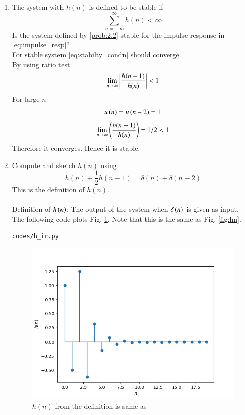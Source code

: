 \documentclass[journal,12pt,twocolumn]{IEEEtran}
\theoremstyle{remark}
\begin{document}
\begin{enumerate}[label=\thesection.\arabic*]
\item The system with $h(n)$ is defined to be stable if
\begin{equation}
\sum_{n=-\infty}^{\infty}h(n) < \infty \label{eq:stabilty_condn}
\end{equation}
Is the system defined by \eqref{prob:2.2} stable for the impulse response in \eqref{eq:impulse_resp}?\\
\solution For stable system \eqref{eq:stabilty_condn} should converge.\\
By using ratio test
\begin{align}
    \lim_{n \to \infty}\left\vert\frac{h(n + 1)}{h(n)}\right\vert &< 1 \\
\end{align}
For large $n$ 
\begin{align}
    u\left(n\right) = u\left(n-2\right) = 1
\end{align}
\begin{align}
  \lim_{n \to \infty}  \left(\frac{h(n + 1)}{h(n)}\right) = 1/2 < 1
\end{align}
Therefore it converges. Hence it is stable.

\item 
Compute and sketch $h(n)$ using 
\begin{equation}
    h(n) + \frac{1}{2}h(n-1) = \delta(n) + \delta(n-2) \label{eq:iir_filter_h}
\end{equation}
This is the definition of $h(n)$.\\
\solution\\
Definition of $h\left(n\right)$: The output of the system when $\delta\left(n\right)$ is given as input.\\

The following code plots Fig. \ref{fig:hndef}. Note that this is the same as Fig. 
\ref{fig:hn}. 

\begin{lstlisting}
codes/h_ir.py
\end{lstlisting}

\begin{figure}[!ht]
    \centering
    \includegraphics[width=\columnwidth]{figs/h_n.png}
    \caption{$h(n)$ from the definition is same as }
    \label{fig:hndef}
\end{figure}


\end{enumerate}
\end{document}
